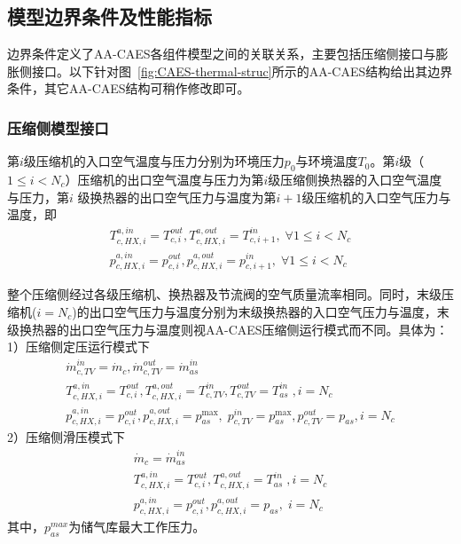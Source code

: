 \subsection{模型边界条件及性能指标}
\label{sec:part-load-energy-boundary}
边界条件定义了AA-CAES各组件模型之间的关联关系，主要包括压缩侧接口与膨胀侧接口。以下针对图~\ref{fig:CAES-thermal-struc}所示的AA-CAES结构给出其边界条件，其它AA-CAES结构可稍作修改即可。

\subsubsection{压缩侧模型接口}
第$i$级压缩机的入口空气温度与压力分别为环境压力$p_0$与环境温度$T_0$。第$i$级（$1\le i<N_c$）压缩机的出口空气温度与压力为第$i$级压缩侧换热器的入口空气温度与压力，第$i$ 级换热器的出口空气压力与温度为第$i+1$级压缩机的入口空气压力与温度，即
\begin{subequations}
\begin{gather}
T_{c,HX,i}^{a,in} = T_{c,i}^{out},T_{c,HX,i}^{a,out} = T_{c,i + 1}^{in},\;\forall 1\le i < {N_c}\\
p_{c,HX,i}^{a,in} = p_{c,i}^{out},p_{c,HX,i}^{a,out} = p_{c,i + 1}^{in},\;\forall 1\le i < {N_c}
\end{gather}
\end{subequations}

整个压缩侧经过各级压缩机、换热器及节流阀的空气质量流率相同。同时，末级压缩机($i=N_c$)的出口空气压力与温度分别为末级换热器的入口空气压力与温度，末级换热器的出口空气压力与温度则视AA-CAES压缩侧运行模式而不同。具体为：1）压缩侧定压运行模式下
\begin{subequations}
\begin{gather}
\dot m_{c,TV}^{in} = {{\dot m}_c},\dot m_{c,TV}^{out} = \dot m_{as}^{in}\\
T_{c,HX,i}^{a,in} = T_{c,i}^{out},T_{c,HX,i}^{a,out} = T_{c,TV}^{in},T_{c,TV}^{out} = T_{as}^{in}\;,i = {N_c}\\
p_{c,HX,i}^{a,in} = p_{c,i}^{out},p_{c,HX,i}^{a,out} = p_{as}^{\max },\;p_{c,TV}^{in} = p_{as}^{\max },p_{c,TV}^{out} = p_{as}^{},i = {N_c}
\end{gather}
\end{subequations}
2）压缩侧滑压模式下
\begin{subequations}
\begin{gather}
{{\dot m}_c} = \dot m_{as}^{in}\\
T_{c,HX,i}^{a,in} = T_{c,i}^{out},T_{c,HX,i}^{a,out} = T_{as}^{in}\;,i = {N_c}\\
p_{c,HX,i}^{a,in} = p_{c,i}^{out},p_{c,HX,i}^{a,out} = p_{as}^{},\;i = {N_c}
\end{gather}
\end{subequations}
其中，$p_{as}^{max}$为储气库最大工作压力。

